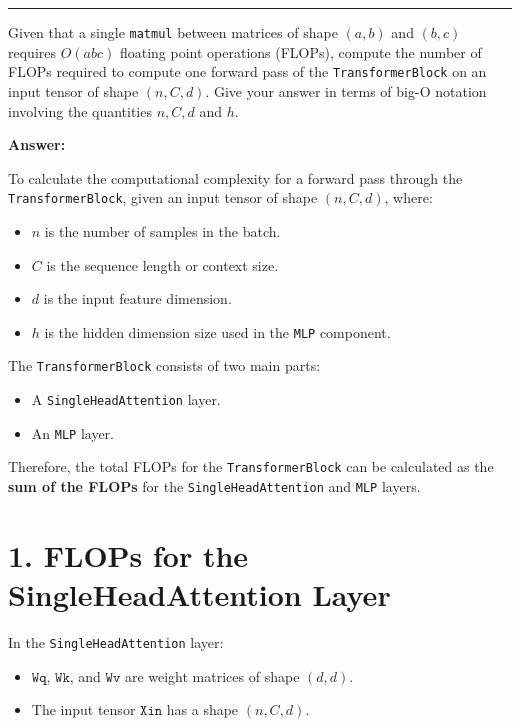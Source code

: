 \documentclass{article}
\newcommand{\mydivider}{\vspace{1em}\hrule\vspace{1em}}
\newcommand{\mypart}[2]{\noindent{\textbf{[#1] point(s) --- #2:}}}
\begin{document}
\mydivider

\mypart{10}{part c}

Given that a single \texttt{matmul} between matrices of shape \((a,b)\) and \((b,c)\)
requires \(O(abc)\) floating point operations (FLOPs), compute the number of FLOPs required to compute one forward pass of the \texttt{TransformerBlock}
on an input tensor of shape \((n, C,d)\).
Give your answer in terms of big-O notation involving the quantities \(n,C,d\) and \(h\).


\begin{tcolorbox}
\textbf{Answer: }

To calculate the computational complexity for a forward pass through the \texttt{TransformerBlock}, given an input tensor of shape \((n, C, d)\), where:

\begin{itemize}
    \item \(n\) is the number of samples in the batch.
    \item \(C\) is the sequence length or context size.
    \item \(d\) is the input feature dimension.
    \item \(h\) is the hidden dimension size used in the \texttt{MLP} component.
\end{itemize}

The \texttt{TransformerBlock} consists of two main parts:
\begin{itemize}
    \item A \texttt{SingleHeadAttention} layer.
    \item An \texttt{MLP} layer.
\end{itemize}

Therefore, the total FLOPs for the \texttt{TransformerBlock} can be calculated as the \textbf{sum of the FLOPs} for the \texttt{SingleHeadAttention} and \texttt{MLP} layers.

\section*{1. FLOPs for the SingleHeadAttention Layer}

In the \texttt{SingleHeadAttention} layer:
\begin{itemize}
    \item \(\texttt{Wq}\), \(\texttt{Wk}\), and \(\texttt{Wv}\) are weight matrices of shape \((d, d)\).
    \item The input tensor \(\texttt{Xin}\) has a shape \((n, C, d)\).
\end{itemize}


\end{tcolorbox}
\end{document}
